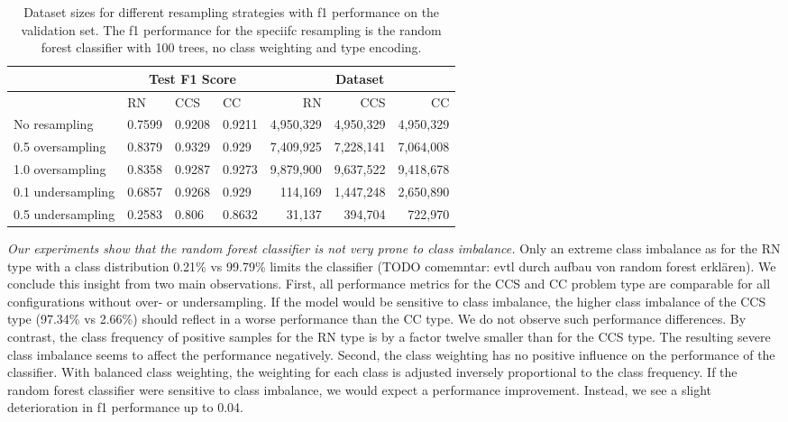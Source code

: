 \begin{table}[]
\tabcolsep=0.11cm
\begin{tabularx}{\textwidth}{lXXX|rrr}
\toprule
                    & \multicolumn{3}{c}{Test F1 Score} & \multicolumn{3}{c}{Dataset}   \\ \midrule
                    & RN        & CCS        & CC     & RN            & CCS         & CC          \\ \midrule
No resampling     &  0.7599   &  0.9208    &  0.9211  &  4,950,329    & 4,950,329   & 4,950,329   \\
0.5 oversampling  &  0.8379   &  0.9329    &  0.929   &  7,409,925    & 7,228,141   & 7,064,008   \\
1.0 oversampling  &  0.8358   &  0.9287    &  0.9273  &  9,879,900    & 9,637,522   & 9,418,678   \\ \midrule
0.1 undersampling &  0.6857   &  0.9268    &  0.929   &  114,169      & 1,447,248   & 2,650,890   \\
0.5 undersampling &  0.2583   &  0.806     &  0.8632  &  31,137       & 394,704     & 722,970     \\ \bottomrule
\end{tabularx}
\caption{Dataset sizes for different resampling strategies with f1 performance on the validation set. The f1 performance for the speciifc resampling is the random forest classifier with 100 trees, no class weighting and type encoding.}
\label{tab:resampling_size_performance_rf}
\end{table}

\textit{Our experiments show that the random forest classifier is not very prone to class imbalance.} Only an extreme class imbalance as for the RN type with a class distribution 0.21\% vs 99.79\% limits the classifier (TODO comemntar: evtl durch aufbau von random forest erklären). We conclude this insight from two main observations. 
First, all performance metrics for the CCS and CC problem type are comparable for all configurations without over- or undersampling. If the model would be sensitive to class imbalance, the higher class imbalance of the CCS type (97.34\% vs 2.66\%) should reflect in a worse performance than the CC type. We do not observe such performance differences. By contrast, the class frequency of positive samples for the RN type is by a factor twelve smaller than for the CCS type. The resulting severe class imbalance seems to affect the performance negatively. 
Second, the class weighting has no positive influence on the performance of the classifier. With balanced class weighting, the weighting for each class is adjusted inversely proportional to the class frequency. If the random forest classifier were sensitive to class imbalance, we would expect a performance improvement. Instead, we see a slight deterioration in f1 performance up to 0.04.


